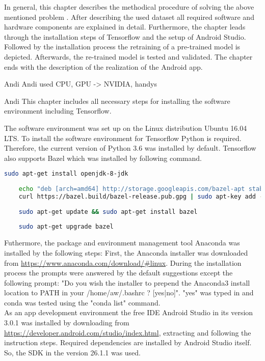 In general, this chapter describes the methodical procedure of solving the above mentioned problem . After describing the used dataset all required software and hardware components are explained in detail. Furthermore, the chapter leads through the installation steps of Tensorflow and the setup of Android Studio. Followed by the installation process the retraining of a pre-trained model is depicted. Afterwards, the re-trained model is tested and validated. The chapter ends with the description of the realization of the Android app.

	 Andi
	 Andi
		used CPU, GPU -> NVIDIA, handys

	 Andi
This chapter includes all necessary steps for installing the software environment including Tensorflow.

The software environment was set up on the Linux distribution Ubuntu 16.04 LTS. To install the software environment for Tensorflow Python is required. Therefore, the current version of Python 3.6 was installed by default. Tensorflow also supports Bazel which was installed by following command.

\begin{lstlisting}[caption=Bazel Installation, label=list:bazel, language=bash]
	sudo apt-get install openjdk-8-jdk
	
	echo "deb [arch=amd64] http://storage.googleapis.com/bazel-apt stable jdk1.8" | sudo tee /etc/apt/				sources.list.d/bazel.list
	curl https://bazel.build/bazel-release.pub.gpg | sudo apt-key add -
	
	sudo apt-get update && sudo apt-get install bazel
	
	sudo apt-get upgrade bazel
\end{lstlisting}	

Futhermore, the package and environment management tool Anaconda was installed by the following steps:
First, the Anaconda installer was downloaded from \url{https://www.anaconda.com/download/#linux}. During the installation process the prompts were answered by the default suggestions except the following prompt: "Do you wish the installer to prepend the Anaconda3 install location to PATH in your /home/aw/.bashrc ? [yes|no]". "yes" was typed in and conda was tested using the "conda list" command. \\

As an app development environment the free IDE Android Studio in its version 3.0.1 was installed by downloading from \url{https://developer.android.com/studio/index.html}, extracting and following the instruction steps. Required dependencies are installed by Android Studio itself. So, the SDK in the version 26.1.1 was used. \\

